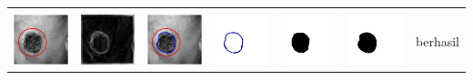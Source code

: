 \begin{table}[H]
\begin{tabular}{|m{0.7in}|m{0.7in}|m{0.7in}|m{0.7in}|m{0.7in}|m{0.7in}|m{0.7in}|}
		&  &  & & & &  \\
		\includegraphics[width=0.7in]{dataset/dataset_3/luka_hitam/ready/28_interp_init.jpg}&
		\includegraphics[width=0.7in]{dataset/dataset_3/luka_hitam/ready/28_interp_ext.jpg}&
		\includegraphics[width=0.7in]{dataset/dataset_3/luka_hitam/ready/28_interp_result.jpg}&
		\includegraphics[width=0.7in]{dataset/dataset_3/luka_hitam/ready/28_gt_r.jpg}&
		\includegraphics[width=0.7in]{dataset/dataset_3/luka_hitam/ready/28_r.jpg}&
		\includegraphics[width=0.7in]{dataset/dataset_3/luka_hitam/ready/28_interp_r.jpg}&
		berhasil\\
		\hline
		

\end{tabular}
\end{table}

